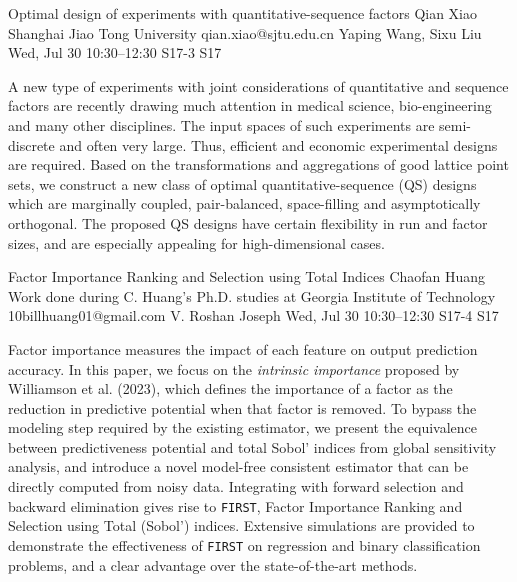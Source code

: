 \begin{talk}
  {Optimal design of experiments with quantitative-sequence factors}%
  {Qian Xiao}%
  {Shanghai Jiao Tong University}%
  {qian.xiao@sjtu.edu.cn}%
  {Yaping Wang, Sixu Liu}%
  {}%
  {Wed, Jul 30 10:30–12:30}%
  {S17-3}%
  {S17}%
  
				
			
A new type of experiments with joint considerations of quantitative and sequence factors are recently drawing much attention in medical science, bio-engineering and many other disciplines. The input spaces of such experiments are semi-discrete and often very large. Thus, efficient and economic experimental designs are required. Based on the transformations and aggregations of good lattice point sets, we construct a new class of optimal quantitative-sequence (QS) designs which are marginally coupled, pair-balanced, space-filling and asymptotically orthogonal. The proposed QS designs have certain flexibility in run and factor sizes, and are especially appealing for high-dimensional cases.

\end{talk}

\begin{talk}
  {Factor Importance Ranking and Selection using Total Indices}%
  {Chaofan Huang}%
  {Work done during C. Huang's Ph.D. studies at Georgia Institute of Technology}%
  {10billhuang01@gmail.com}%
  {V. Roshan Joseph}%
  {}%
  {Wed, Jul 30 10:30–12:30}%
  {S17-4}%
  {S17}%
  
				
			
Factor importance measures the impact of each feature on output prediction accuracy. In this paper, we focus on the \emph{intrinsic importance} proposed by Williamson et al. (2023), which defines the importance of a factor as the reduction in predictive potential when that factor is removed. To bypass the modeling step required by the existing estimator, we present the equivalence between predictiveness potential and total Sobol' indices from global sensitivity analysis, and introduce a novel model-free consistent estimator that can be directly computed from noisy data. Integrating with forward selection and backward elimination gives rise to \texttt{FIRST}, Factor Importance Ranking and Selection using Total (Sobol') indices. Extensive simulations are provided to demonstrate the effectiveness of \texttt{FIRST} on regression and binary classification problems, and a clear advantage over the state-of-the-art methods.
\end{talk}

